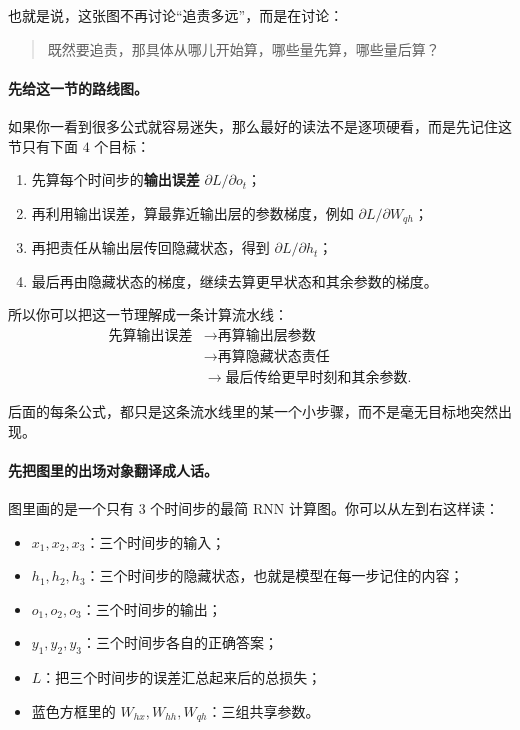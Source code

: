 \documentclass[12pt,a4paper]{ctexart}
\begin{document}
也就是说，这张图不再讨论“追责多远”，而是在讨论：
\begin{quote}
既然要追责，那具体从哪儿开始算，哪些量先算，哪些量后算？
\end{quote}

\paragraph{先给这一节的路线图。}
如果你一看到很多公式就容易迷失，那么最好的读法不是逐项硬看，而是先记住这节只有下面 \(4\) 个目标：
\begin{enumerate}
  \item 先算每个时间步的\textbf{输出误差} \(\partial L/\partial o_t\)；
  \item 再利用输出误差，算最靠近输出层的参数梯度，例如 \(\partial L/\partial W_{qh}\)；
  \item 再把责任从输出层传回隐藏状态，得到 \(\partial L/\partial h_t\)；
  \item 最后再由隐藏状态的梯度，继续去算更早状态和其余参数的梯度。
\end{enumerate}

所以你可以把这一节理解成一条计算流水线：
\[
\begin{aligned}
\text{先算输出误差}
&\longrightarrow
\text{再算输出层参数} \\
&\longrightarrow
\text{再算隐藏状态责任} \\
&\longrightarrow
\text{最后传给更早时刻和其余参数}.
\end{aligned}
\]

后面的每条公式，都只是这条流水线里的某一个小步骤，而不是毫无目标地突然出现。

\paragraph{先把图里的出场对象翻译成人话。}
图里画的是一个只有 \(3\) 个时间步的最简 RNN 计算图。你可以从左到右这样读：
\begin{itemize}
  \item \(x_1,x_2,x_3\)：三个时间步的输入；
  \item \(h_1,h_2,h_3\)：三个时间步的隐藏状态，也就是模型在每一步记住的内容；
  \item \(o_1,o_2,o_3\)：三个时间步的输出；
  \item \(y_1,y_2,y_3\)：三个时间步各自的正确答案；
  \item \(L\)：把三个时间步的误差汇总起来后的总损失；
  \item 蓝色方框里的 \(W_{hx},W_{hh},W_{qh}\)：三组共享参数。
\end{itemize}
\end{document}
